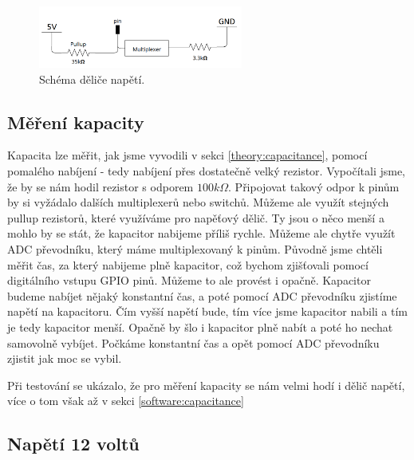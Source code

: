 \documentclass[11pt,a4paper,twoside,openright]{report}
\begin{document}
\begin{figure}[ht!]
  \includegraphics[width=0.6\textwidth]{img/voltage_divider.png}
  \centering
  \caption{Schéma děliče napětí.}
  \label{fig:voltage_divider}
\end{figure}

\subsection{Měření kapacity}

Kapacita lze měřit, jak jsme vyvodili v sekci \ref{theory:capacitance}, pomocí pomalého nabíjení - tedy nabíjení přes dostatečně velký rezistor. Vypočítali jsme, že by se nám hodil rezistor s odporem $100k\Omega$. Připojovat takový odpor k pinům by si vyžádalo dalších multiplexerů nebo switchů. Můžeme ale využít stejných pullup rezistorů, které využíváme pro napěťový dělič. Ty jsou o něco menší a mohlo by se stát, že kapacitor nabijeme příliš rychle. Můžeme ale chytře využít ADC převodníku, který máme multiplexovaný k pinům. Původně jsme chtěli měřit čas, za který nabijeme plně kapacitor, což bychom zjišťovali pomocí digitálního vstupu GPIO pinů. Můžeme to ale provést i opačně. Kapacitor budeme nabíjet nějaký konstantní čas, a poté pomocí ADC převodníku zjistíme napětí na kapacitoru. Čím vyšší napětí bude, tím více jsme kapacitor nabili a tím je tedy kapacitor menší. Opačně by šlo i kapacitor plně nabít a poté ho nechat samovolně vybíjet. Počkáme konstantní čas a opět pomocí ADC převodníku zjistit jak moc se vybil. 

Při testování se ukázalo, že pro měření kapacity se nám velmi hodí i dělič napětí, více o tom však až v sekci \ref{software:capacitance}

\subsection {Napětí 12 voltů\label{12v}}
\end{document}
